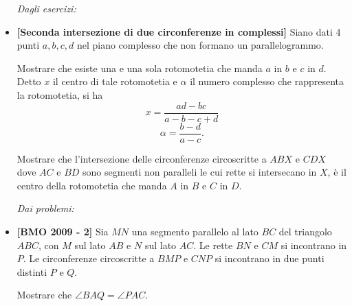 \begin{itemize}
\emph{Dagli esercizi:}

\item \textbf{[Seconda intersezione di due circonferenze in complessi]} Siano dati 4 punti $a, b, c, d$ nel piano complesso che non formano un parallelogrammo.

Mostrare che esiste una e una sola rotomotetia che
manda $a$ in $b$ e $c$ in $d$. Detto $x$ il centro di tale rotomotetia e $\alpha$ il numero complesso che rappresenta la rotomotetia, si ha
$$
x=\frac{ad-bc}{a-b-c+d}
$$
$$
\alpha=\frac{b-d}{a-c}.
$$

Mostrare che l'intersezione delle circonferenze circoscritte a $ABX$ e $CDX$ dove $AC$ e $BD$ sono segmenti non paralleli le cui rette si intersecano in $X$, è il centro della rotomotetia che manda $A$ in $B$ e $C$ in $D$. 



 
\emph{Dai problemi:}

\item \textbf{[BMO 2009 - 2]} Sia $MN$ una segmento parallelo al lato $BC$ del triangolo $ABC$, con $M$ sul lato $AB$ e $N$ sul lato $AC$. Le rette $BN$ e $CM$ si incontrano in $P$. Le circonferenze circoscritte a $BMP$ e $CNP$ si incontrano in due punti distinti $P$ e $Q$. 
 
 Mostrare che $\angle BAQ = \angle PAC$.
 
 
 

\end{itemize}

